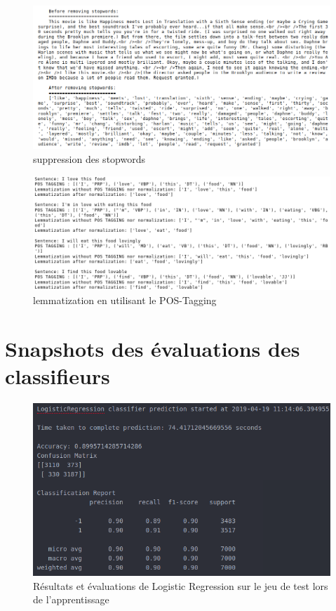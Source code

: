 \documentclass[12pt,a4paper]{report}
\theoremstyle{definition}
\begin{document}
\begin{appendices}
\begin{figure}[!ht]
  \centering
  \includegraphics[scale=0.4]{images/snapshots/preprocessing/remove_stopwords.png}
  \caption{suppression des stopwords}
  \label{fig:remove_stopwords}
\end{figure}

\begin{figure}[!ht]
  \centering
  \includegraphics[scale=0.4]{images/snapshots/preprocessing/lemmatization.png}
  \caption{lemmatization en utilisant le POS-Tagging}
  \label{fig:lemmatization}
\end{figure}

\chapter{Snapshots des évaluations des classifieurs}
\begin{figure}[!ht]
  \centering
  \includegraphics[scale=0.5]{images/snapshots/predictions/logistic_regression/training_set_results.png}
  \caption{Résultats et évaluations de Logistic Regression sur le jeu de test lors de l'apprentissage}
  \label{fig:lr_fit_test}
\end{figure}


\end{appendices}
\end{document}
